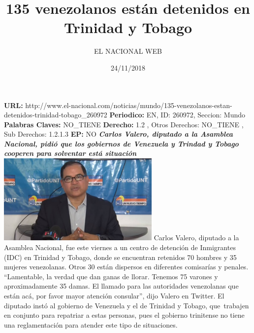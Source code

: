 \documentclass{article}%
\title{\textbf{135 venezolanos están detenidos en Trinidad y Tobago}}%
\author{EL NACIONAL WEB}%
\date{24/11/2018}%
\begin{document}
%
\normalsize%
\maketitle%
\textbf{URL: }%
http://www.el{-}nacional.com/noticias/mundo/135{-}venezolanos{-}estan{-}detenidos{-}trinidad{-}tobago\_260972\newline%
%
\textbf{Periodico: }%
EN, %
ID: %
260972, %
Seccion: %
Mundo\newline%
%
\textbf{Palabras Claves: }%
NO\_TIENE\newline%
%
\textbf{Derecho: }%
1.2%
, Otros Derechos: %
NO\_TIENE%
, Sub Derechos: %
1.2.1.3%
\newline%
%
\textbf{EP: }%
NO\newline%
\newline%
%
\textbf{\textit{Carlos Valero, diputado a la Asamblea Nacional, pidió que los gobiernos de Venezuela y Trindad y Tobago cooperen para solventar está situación}}%
\newline%
\newline%
%
\includegraphics[width=300px]{57.jpg}%
\newline%
%
Carlos Valero, diputado a la Asamblea Nacional, fue este viernes a un centro de detención de Inmigrantes (IDC) en Trinidad y Tobago, donde se encuentran retenidos 70 hombres y 35 mujeres venezolanas. Otros 30 están dispersos en diferentes comisarías y penales.%
\newline%
%
“Lamentable, la verdad que dan ganas de llorar. Tenemos 75 varones y aproximadamente 35 damas. El llamado para las autoridades venezolanas que están acá, por favor mayor atención consular”, dijo Valero en Twitter.%
\newline%
%
El diputado instó al gobierno de Venezuela y el de Trinidad y Tobago, que~trabajen en conjunto para repatriar a estas personas, pues el gobierno trinitense no tiene una reglamentación para atender este tipo de situaciones.%
\newline%
%
\end{document}
